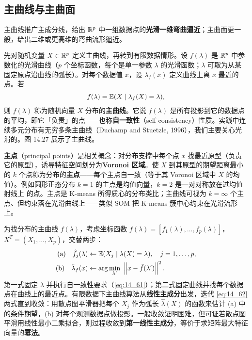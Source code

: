 \subsection{主曲线与主曲面}

主曲线推广主成分线，给出 $\mathbb{R}^p$ 中一组数据点的\textbf{光滑一维弯曲逼近}；主曲面更一般，给出二维或更高维的弯曲流形逼近。

先对随机变量 $X\in\mathbb{R}^p$ 定义主曲线，再转到有限数据情形。设 $f(\lambda)$ 是 $\mathbb{R}^p$ 中参数化的光滑曲线（$p$ 个坐标函数，每个是单一参数 $\lambda$ 的光滑函数；$\lambda$ 可取为从某固定原点沿曲线的弧长）。对每个数据值 $x$，设 $\lambda_f(x)$ 定义曲线上离 $x$ 最近的点。若
\begin{equation}
f(\lambda) = \mathbb{E}(X \mid \lambda_f(X)=\lambda), \label{eq:14_61}
\end{equation}
则 $f(\lambda)$ 称为随机向量 $X$ 分布的\textbf{主曲线}。它说 $f(\lambda)$ 是所有投影到它的数据点的平均，即它「负责」的点——也称\textbf{自一致性}（self-consistency）性质。实践中连续多元分布有无穷多条主曲线（Duchamp and Stuetzle, 1996），我们主要关心光滑的。图 14.27 展示了主曲线。

\textbf{主点}（principal points）是相关概念：对分布支撑中每个点 $x$ 找最近原型（负责它的原型），诱导特征空间划分为\textbf{Voronoi 区域}。使 $X$ 到其原型的期望距离最小的 $k$ 个点称为分布的\textbf{主点}——每个主点自一致（等于其 Voronoi 区域中 $X$ 的均值）。例如圆形正态分布 $k=1$ 的主点是均值向量，$k=2$ 是一对对称放在过均值射线上 的点。主点是 K-means 所得质心的分布类比；主曲线可视为 $k=\infty$ 个主点、但约束落在光滑曲线上——类似 SOM 把 K-means 簇中心约束在光滑流形上。

为找分布的主曲线 $f(\lambda)$，考虑坐标函数 $f(\lambda)=[f_1(\lambda),\dots,f_p(\lambda)]$，$X^T=(X_1,\dots,X_p)$，交替两步：
\begin{align}
\text{(a)}\quad \hat f_j(\lambda) &\leftarrow \E(X_j \mid \lambda(X)=\lambda),\quad j=1,\dots,p, \nonumber\\
\text{(b)}\quad \hat\lambda_f(x) &\leftarrow \argmin_{\lambda'}\ \norm{x - \hat f(\lambda')}^2. \label{eq:14_62}
\end{align}
第一式固定 $\lambda$ 并执行自一致性要求（\eqref{eq:14_61}）；第二式固定曲线并找每个数据点在曲线上的最近点。有限数据下主曲线算法从\textbf{线性主成分}出发，迭代 \eqref{eq:14_62} 两式直到收敛：用散点图平滑器把每个 $X_j$ 作为弧长 $\hat\lambda(X)$ 的函数来估计 (a) 中的条件期望，(b) 对每个观测数据点做投影。一般收敛证明困难，但可证若散点图平滑用线性最小二乘拟合，则过程收敛到\textbf{第一线性主成分}，等价于求矩阵最大特征向量的\textbf{幂法}。


